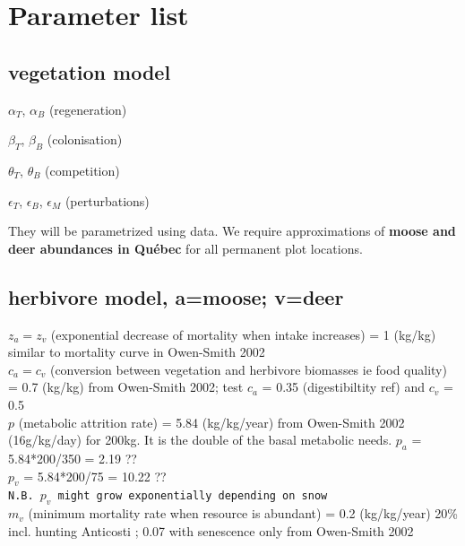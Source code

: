 

\newpage
\section{Parameter list}

\subsection*{vegetation model}

$\alpha_T$, $\alpha_B$ (regeneration)

$\beta_T$, $\beta_B$ (colonisation)

$\theta_T$, $\theta_B$ (competition)

$\epsilon_T$, $\epsilon_B$, $\epsilon_M$ (perturbations)

They will be parametrized using data. We require approximations of \textbf{moose and deer abundances in Québec} for all permanent plot locations.

\subsection*{herbivore model, a=moose; v=deer}

$z_a = z_v$ (exponential decrease of mortality when intake increases) = 1 (kg/kg) similar to mortality curve in Owen-Smith 2002 \\

$c_a = c_v$ (conversion between vegetation and herbivore biomasses ie food quality) = 0.7 (kg/kg) from Owen-Smith 2002; test $c_a$ = 0.35 (digestibiltity ref) and $c_v$ = 0.5\\

$p$ (metabolic attrition rate) = 5.84 (kg/kg/year) from Owen-Smith 2002 (16g/kg/day)
for 200kg. It is the double of the basal metabolic needs. 
$p_a$ = 5.84*200/350 = 2.19 ?? \\
$p_v$ = 5.84*200/75 = 10.22 ??\\
\texttt{N.B. $p_v$ might grow exponentially depending on snow} \\

$m_v$ (minimum mortality rate when resource is abundant) = 0.2 (kg/kg/year) 20\% incl. hunting Anticosti ; 0.07 with senescence only from Owen-Smith 2002\\

